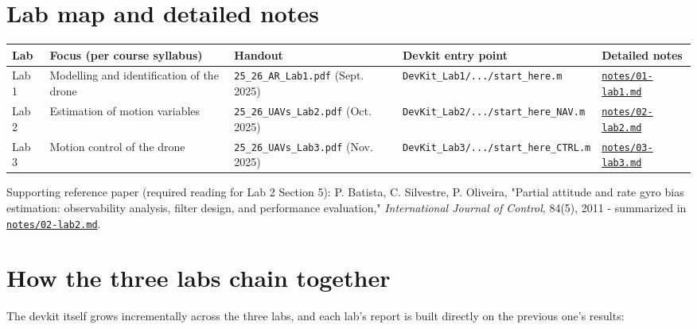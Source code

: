 \documentclass[11pt]{article}
\begin{document}
\section{Lab map and detailed notes}

\begin{center}
\small
\setlength{\tabcolsep}{3pt}
\begin{longtable}{|p{1.1cm}|p{4.9cm}|p{3.1cm}|p{3.3cm}|p{2.6cm}|}
\hline
Lab & Focus (per course syllabus) & Handout & Devkit entry point & Detailed notes \\
\hline
\endhead
Lab 1 & Modelling and identification of the drone & \texttt{25\_\allowbreak{}26\_\allowbreak{}AR\_\allowbreak{}Lab1.pdf} (Sept. 2025) & \texttt{DevKit\_\allowbreak{}Lab1/.../start\_\allowbreak{}here.m} & \href{notes/01-lab1.pdf}{\texttt{notes/01-lab1.md}} \\
\hline
Lab 2 & Estimation of motion variables & \texttt{25\_\allowbreak{}26\_\allowbreak{}UAVs\_\allowbreak{}Lab2.pdf} (Oct. 2025) & \texttt{DevKit\_\allowbreak{}Lab2/.../start\_\allowbreak{}here\_\allowbreak{}NAV.m} & \href{notes/02-lab2.pdf}{\texttt{notes/02-lab2.md}} \\
\hline
Lab 3 & Motion control of the drone & \texttt{25\_\allowbreak{}26\_\allowbreak{}UAVs\_\allowbreak{}Lab3.pdf} (Nov. 2025) & \texttt{DevKit\_\allowbreak{}Lab3/.../start\_\allowbreak{}here\_\allowbreak{}CTRL.m} & \href{notes/03-lab3.pdf}{\texttt{notes/03-lab3.md}} \\
\hline
\end{longtable}
\end{center}

Supporting reference paper (required reading for Lab 2 Section 5): P. Batista, C. Silvestre, P. Oliveira, "Partial attitude and rate gyro bias estimation: observability analysis, filter design, and performance evaluation," \textit{International Journal of Control}, 84(5), 2011 - summarized in \href{notes/02-lab2.pdf}{\texttt{notes/02-lab2.md}}.

\section{How the three labs chain together}

The devkit itself grows incrementally across the three labs, and each lab's report is built directly on the previous one's results:
\end{document}
